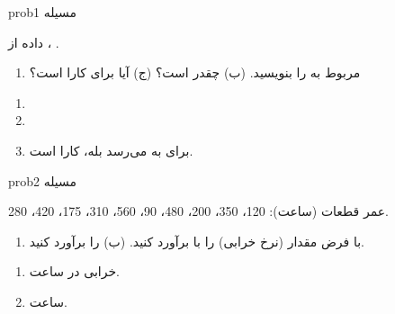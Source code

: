 
\begin{PSbox}[unbreakable]{prob}{مسیله 1}

داده از ، .

\begin{enumerate}
\def\labelenumi{(\PSalph{enumi})}
\tightlist
\item
   مربوط به \lr{$\mu$} را بنویسید. (ب)  چقدر است؟ (ج) آیا  برای \lr{$\mu$} کارا است؟
\end{enumerate}

\PSsolution{} 

\begin{enumerate}
\def\labelenumi{(\PSalph{enumi})}
\tightlist
\item
\item
\item
   برای  به  می‌رسد \lr{\mbox{\ensuremath{\to}}} بله، کارا است.
\end{enumerate}

\end{PSbox}

\begin{PSbox}[unbreakable]{prob}{مسیله 2}

عمر قطعات (ساعت): 120، 350، 200، 480، 90، 560، 310، 175، 420، 280.

\begin{enumerate}
\def\labelenumi{(\PSalph{enumi})}
\tightlist
\item
  با فرض  مقدار \lr{$\lambda$} (نرخ خرابی) را با  برآورد کنید. (ب)  را برآورد کنید.
\end{enumerate}

\PSsolution{} 

\begin{enumerate}
\def\labelenumi{(\PSalph{enumi})}
\tightlist
\item
  \PSbr{} خرابی در ساعت.
\item
   ساعت.
\end{enumerate}

\end{PSbox}

